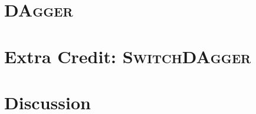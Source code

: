 \documentclass[12pt]{article}
\begin{document}
\section{\textsc{DAgger}}

\section{Extra Credit: \textsc{SwitchDAgger}}

\section{Discussion}
\end{document}

